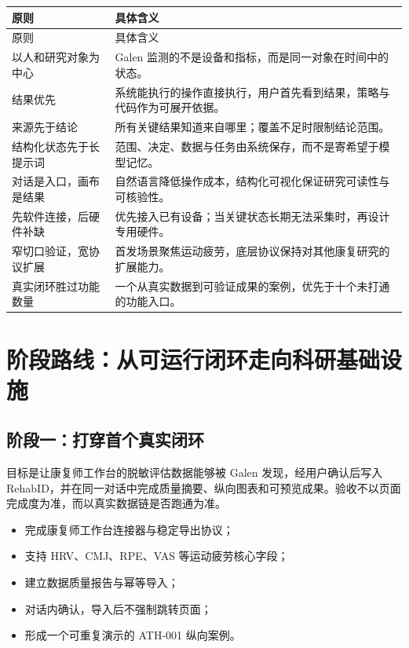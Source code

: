 \documentclass[11pt,a4paper,UTF8]{ctexart}
\begin{document}
\begin{longtable}{@{}L{3.6cm}L{12.0cm}@{}}
\toprule
原则 & 具体含义 \\
\midrule
\endfirsthead
\toprule
原则 & 具体含义 \\
\midrule
\endhead
以人和研究对象为中心 & Galen 监测的不是设备和指标，而是同一对象在时间中的状态。 \\
结果优先 & 系统能执行的操作直接执行，用户首先看到结果，策略与代码作为可展开依据。 \\
来源先于结论 & 所有关键结果知道来自哪里；覆盖不足时限制结论范围。 \\
结构化状态先于长提示词 & 范围、决定、数据与任务由系统保存，而不是寄希望于模型记忆。 \\
对话是入口，画布是结果 & 自然语言降低操作成本，结构化可视化保证研究可读性与可核验性。 \\
先软件连接，后硬件补缺 & 优先接入已有设备；当关键状态长期无法采集时，再设计专用硬件。 \\
窄切口验证，宽协议扩展 & 首发场景聚焦运动疲劳，底层协议保持对其他康复研究的扩展能力。 \\
真实闭环胜过功能数量 & 一个从真实数据到可验证成果的案例，优先于十个未打通的功能入口。 \\
\bottomrule
\end{longtable}

\section{阶段路线：从可运行闭环走向科研基础设施}

\subsection{阶段一：打穿首个真实闭环}

目标是让康复师工作台的脱敏评估数据能够被 Galen 发现，经用户确认后写入 RehabID，并在同一对话中完成质量摘要、纵向图表和可预览成果。验收不以页面完成度为准，而以真实数据链是否跑通为准。

\begin{itemize}
  \item 完成康复师工作台连接器与稳定导出协议；
  \item 支持 HRV、CMJ、RPE、VAS 等运动疲劳核心字段；
  \item 建立数据质量报告与幂等导入；
  \item 对话内确认，导入后不强制跳转页面；
  \item 形成一个可重复演示的 ATH-001 纵向案例。
\end{itemize}
\end{document}
